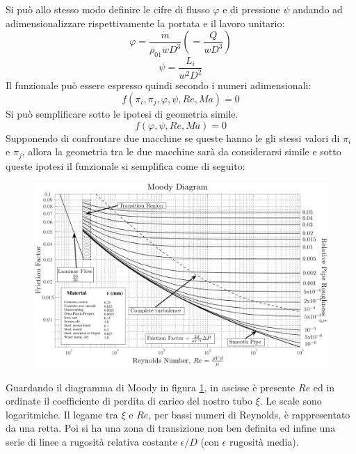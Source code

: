 Si può allo stesso modo definire le cifre di flusso $\varphi$ e di pressione $\psi$ andando ad adimensionalizzare rispettivamente la portata e il lavoro unitario:
\begin{equation}
\varphi = \frac{\dot{m}}{\rho_{01}w D^3} \left( =\frac{Q}{w D^3} \right)
\end{equation}
\begin{equation}
\psi = \frac{L_i}{w^2 D^2}
\end{equation}
Il funzionale può essere espresso quindi secondo i numeri adimensionali:
\begin{equation}
f(\pi_i,\pi_j,\varphi,\psi,Re,Ma)=0
\end{equation}
Si può semplificare sotto le ipotesi di geometria simile.
\begin{equation}
f(\varphi,\psi,Re,Ma)=0
\end{equation}
Supponendo di confrontare due macchine se queste hanno le gli stessi valori di $\pi_i$ e $\pi_j$, allora la geometria tra le due macchine sarà da considerarsi simile e sotto queste ipotesi il funzionale si semplifica come di seguito:
\begin{figure}
\centering
  \includegraphics[width=\textwidth]{fig/moody.jpg}
\caption{}
\label{fig:moody}
\end{figure}
Guardando il diagramma di Moody in figura \ref{fig:moody}, in ascisse è presente $Re$ ed in ordinate il coefficiente di perdita di carico del nostro tubo $\xi$. Le scale sono logaritmiche. Il legame tra $\xi$ e $Re$, per bassi numeri di Reynolds, è rappresentato da una retta. Poi si ha una zona di transizione non ben definita ed infine una serie di linee a rugosità relativa costante $\epsilon/D$ (con $\epsilon$ rugosità media).

